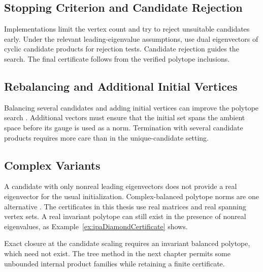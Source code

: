 \subsection{Stopping Criterion and Candidate Rejection}
\label{sec:invStoppingCriterion}

Implementations limit the vertex count and try to reject unsuitable candidates early.
Under the relevant leading-eigenvalue assumptions, \citet{GuglielmiProtasov2013ExactComputationJSR} use dual eigenvectors of cyclic candidate products for rejection tests.
Candidate rejection guides the search.
The final certificate follows from the verified polytope inclusions.

\subsection{Rebalancing and Additional Initial Vertices}
\label{sec:invRebalancing}

Balancing several candidates and adding initial vertices can improve the polytope search \citep{GuglielmiProtasov2016InvariantPolytopes}.
Additional vectors must ensure that the initial set spans the ambient space before its gauge is used as a norm.
Termination with several candidate products requires more care than in the unique-candidate setting.

\subsection{Complex Variants}
\label{sec:invEigenvectorCases}

A candidate with only nonreal leading eigenvectors does not provide a real eigenvector for the usual initialization.
Complex-balanced polytope norms are one alternative \citep{GuglielmiWirthZennaro2005ComplexPolytopeExtremality,GuglielmiZennaro2007BalancedComplexPolytopes}.
The certificates in this thesis use real matrices and real spanning vertex sets.
A real invariant polytope can still exist in the presence of nonreal eigenvalues, as Example~\ref{ex:ipaDiamondCertificate} shows.

Exact closure at the candidate scaling requires an invariant balanced polytope, which need not exist.
The tree method in the next chapter permits some unbounded internal product families while retaining a finite certificate.
